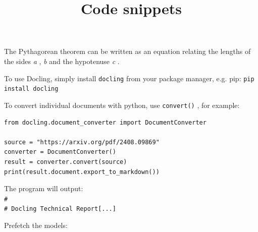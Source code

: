 \documentclass[11pt,a4paper]{article}
\title{Code snippets}
\begin{document}
\maketitle

The Pythagorean theorem can be written as an equation relating the lengths of the sides \textit{a} , \textit{b} and the hypotenuse \textit{c} .

To use Docling, simply install \texttt{docling} from your package manager, e.g. pip: \texttt{pip install docling}

To convert individual documents with python, use \texttt{convert()} , for example:

\begin{verbatim}
from docling.document_converter import DocumentConverter

source = "https://arxiv.org/pdf/2408.09869"
converter = DocumentConverter()
result = converter.convert(source)
print(result.document.export_to_markdown())
\end{verbatim}

The program will output: \texttt{\\#\\# Docling Technical Report[...]}

Prefetch the models:

\end{document}
